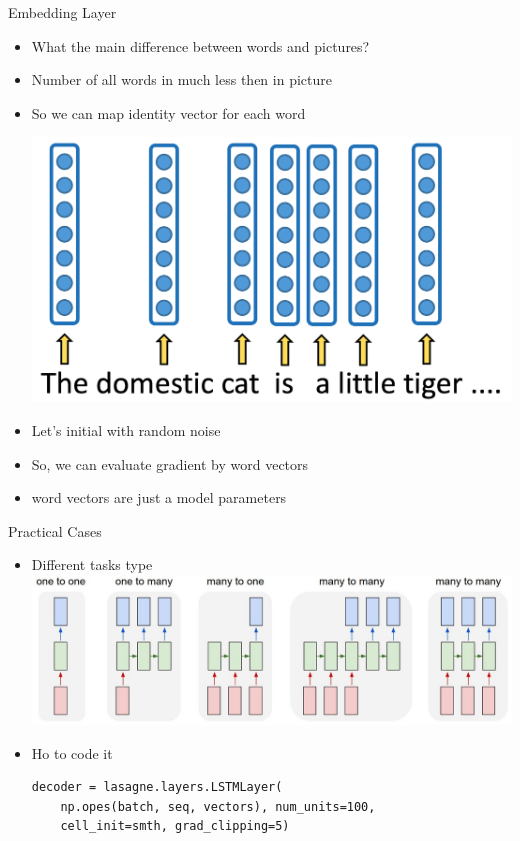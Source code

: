 \documentclass{beamer}
\begin{document}
\begin{frame}{Embedding Layer}
	\begin{itemize}
		 \item What the main difference between words and pictures?
		 \item Number of all words in much less then in picture 
		 \item So we can map identity vector for each word
		 \begin{center}
			\includegraphics[scale=0.2]{./img/text_repr}
		\end{center}
		 \item Let's initial with random noise
		 \item So, we can evaluate gradient by word vectors
		 \item  word vectors are just a model parameters 
	\end{itemize}
\end{frame}



\begin{frame}[fragile]{Practical Cases}
	\begin{itemize}
		 \item Different tasks type 
		 \includegraphics[scale=0.3]{./img/diags}
		 \item Ho to code it
		 
\begin{verbatim}
decoder = lasagne.layers.LSTMLayer(
    np.opes(batch, seq, vectors), num_units=100, 
    cell_init=smth, grad_clipping=5)
\end{verbatim}
		
	\end{itemize}
\end{frame}
\end{document}
